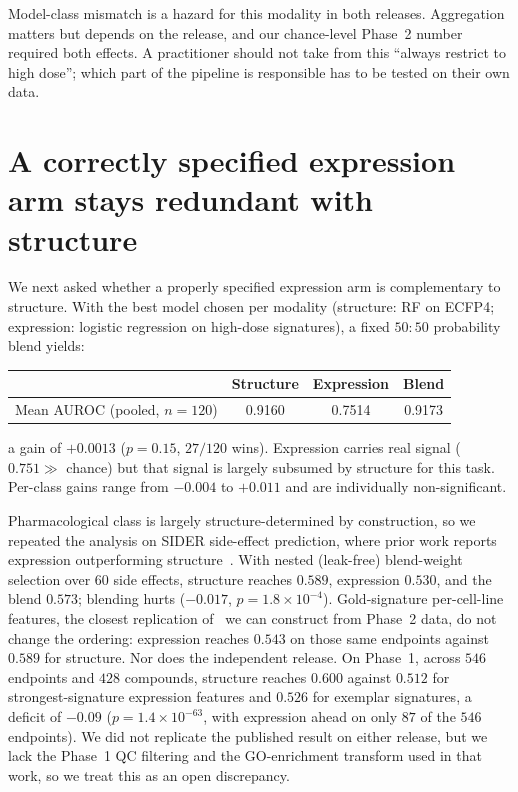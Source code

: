 \documentclass[conference]{IEEEtran}
\begin{document}
Model-class mismatch is a hazard for this modality in both
releases. Aggregation matters but depends on the release, and our chance-level
Phase~2 number required both effects. A practitioner should not take from this
``always restrict to high dose''; which part of the pipeline is responsible has
to be tested on their own data.

\section{A correctly specified expression arm stays redundant with structure}
\label{sec:f3}

We next asked whether a properly specified expression arm is complementary to
structure. With the best model chosen per modality
(structure: RF on ECFP4; expression: logistic regression on high-dose
signatures), a fixed $50{:}50$ probability blend yields:

\begin{center}\small
\setlength{\tabcolsep}{4pt}
\begin{tabular}{lccc}
\toprule
& Structure & Expression & Blend \\
\midrule
Mean AUROC (pooled, $n{=}120$) & 0.9160 & 0.7514 & 0.9173 \\
\bottomrule
\end{tabular}
\end{center}

a gain of $+0.0013$ ($p = 0.15$, $27/120$ wins). Expression carries real signal
($0.751 \gg$ chance) but that signal is largely subsumed by structure for this
task. Per-class gains range from $-0.004$ to $+0.011$ and are individually
non-significant.

Pharmacological class is largely
structure-determined by construction, so we repeated the analysis on SIDER
side-effect prediction, where prior work reports expression outperforming
structure~\cite{wang2016}. With nested (leak-free) blend-weight selection over
$60$ side effects, structure reaches $0.589$, expression $0.530$, and the blend
$0.573$; blending hurts ($-0.017$, $p = 1.8\times10^{-4}$).
Gold-signature per-cell-line features, the closest replication
of~\cite{wang2016} we can construct from Phase~2 data, do not change the
ordering: expression reaches $0.543$ on those same endpoints against $0.589$ for
structure. Nor does the independent release. On Phase~1, across $546$ endpoints and $428$ compounds, structure reaches
$0.600$ against $0.512$ for strongest-signature expression features and $0.526$
for exemplar signatures, a deficit of $-0.09$ ($p = 1.4\times10^{-63}$, with
expression ahead on only $87$ of the $546$ endpoints). We did not replicate the
published result on either release, but we lack the Phase~1 QC filtering and the
GO-enrichment transform used in that work, so we treat this as an open
discrepancy.
\end{document}
